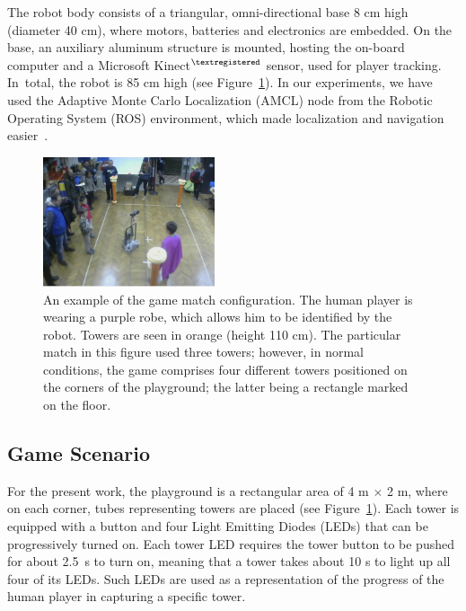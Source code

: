 {The robot body consists of a triangular, omni-directional base 8 cm high (diameter 40 cm), where motors, batteries and electronics are embedded. On the base, an auxiliary aluminum structure is mounted, hosting the on-board computer and a Microsoft Kinect$^{\tiny{\textregistered}}$ sensor, used for player tracking. In~total, the robot is 85 cm high (see Figure~\ref{figure:game_match}). In our experiments, we have used the Adaptive Monte Carlo Localization (AMCL) node from the Robotic Operating System (ROS) environment, which made localization and navigation easier~\cite{ballardini_ira_laser_tools:_2014}.

\begin{figure}[H]
\centering
\includegraphics[width=0.45\textwidth]{images/05-modeling/event.jpg}
\caption{An example of the game match configuration. The human player is wearing a purple robe, which allows him to be identified by the robot. Towers are seen in orange (height 110 cm). The particular match in this figure used three towers; however, in normal conditions, the game comprises four different towers positioned on the corners of the playground; the latter being a rectangle marked on the floor.}
\label{figure:game_match}
\end{figure}

\subsection{Game Scenario}
For the present work, the playground is a rectangular area of 4 m $\times$ 2 m, where on each corner, tubes representing towers are placed (see Figure~\ref{figure:game_match}). Each tower is equipped with a button and four Light Emitting Diodes (LEDs) that can be progressively turned on. Each tower LED requires the tower button to be pushed for about 2.5~s to turn on, meaning that a tower takes about 10 s to light up all four of its LEDs. Such LEDs are used as a representation of the progress of the human player in capturing a specific tower. %

}
